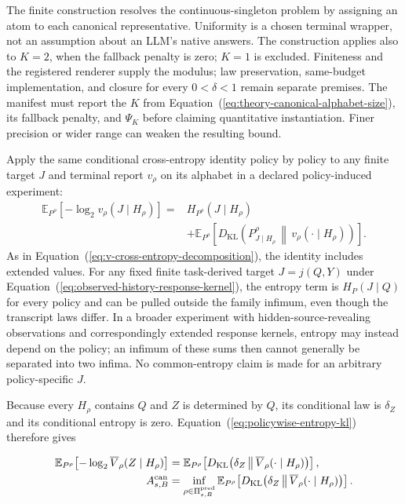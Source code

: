 \documentclass[10pt]{article} %
\renewcommand{\eqref}[1]{\textup{(\ref{#1})}}
\providecommand{\1}{\mathbf{1}}  %
\theoremstyle{remark}
\theoremstyle{definition}
\begin{document}
The finite construction resolves the continuous-singleton problem by
assigning an atom to each canonical representative. Uniformity is a
chosen terminal wrapper, not an assumption about an LLM's native answers.
The construction applies also to $K=2$, when the fallback penalty is zero;
$K=1$ is excluded. Finiteness and the registered renderer supply the
modulus; law preservation, same-budget implementation, and closure for
every $0<\delta<1$ remain separate premises. The manifest must report the
$K$ from Equation~\eqref{eq:theory-canonical-alphabet-size}, its fallback
penalty, and $\Psi_K$ before claiming quantitative instantiation. Finer
precision or wider range can weaken the resulting bound.

Apply the same conditional cross-entropy identity policy by policy to
any finite target $J$ and terminal report $v_\rho$ on its alphabet in a
declared policy-induced experiment:
\begin{equation}
\begin{split}
\mathbb E_{P^\rho}[-\log_2v_\rho(J\mid H_\rho)]
={}&H_{P^\rho}(J\mid H_\rho)\\
&+\mathbb E_{P^\rho}\!\left[
D_{\mathrm{KL}}\!\left(
P^\rho_{J\mid H_\rho}\,\middle\|\,v_\rho(\cdot\mid H_\rho)
\right)\right].
\end{split}
\label{eq:policywise-entropy-kl}
\end{equation}
As in Equation~\eqref{eq:v-cross-entropy-decomposition}, the identity
includes extended values. For any fixed finite task-derived target $J=j(Q,Y)$ under
Equation~\eqref{eq:observed-history-response-kernel}, the entropy term is
$H_P(J\mid Q)$ for every policy and can be pulled outside the family
infimum, even though the transcript laws differ. In a broader experiment
with hidden-source-revealing observations and correspondingly extended
response kernels, entropy may instead depend on the policy; an infimum
of these sums then cannot generally be separated into two infima.
No common-entropy claim is made for an arbitrary policy-specific $J$.

Because every $H_\rho$ contains $Q$ and $Z$ is determined by $Q$, its
conditional law is $\delta_Z$ and its conditional entropy is zero.
Equation~\eqref{eq:policywise-entropy-kl} therefore gives

\begin{align}
\mathbb E_{P^\rho}\!\left[
-\log_2\overline V_\rho(Z\mid H_\rho)
\right]
&=
\mathbb E_{P^\rho}\!\left[
D_{\mathrm{KL}}\!\left(
\delta_Z
\,\middle\|\,
\overline V_\rho(\cdot\mid H_\rho)
\right)
\right],
\notag\\
A_{s,B}^{\mathrm{can}}
&=
\inf_{\rho\in\Pi_{s,B}^{\mathrm{pred}}}
\mathbb E_{P^\rho}\!\left[
D_{\mathrm{KL}}\!\left(
\delta_Z
\,\middle\|\,
\overline V_\rho(\cdot\mid H_\rho)
\right)
\right].
\label{eq:canonical-accessibility-gap}
\end{align}
\end{document}
